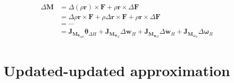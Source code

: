 \begin{equation}
    \begin{split}
        \Delta \mathbf{M} &= \Delta(\rho\mathbf{r}) \times \mathbf{F} + \rho\mathbf{r} \times \Delta\mathbf{F}\\
        &= \Delta\rho \mathbf{r} \times \mathbf{F} + \rho \Delta\mathbf{r} \times \mathbf{F} + \rho\mathbf{r} \times \Delta\mathbf{F}\\
        &= \cdots \\
        &= \mathbf{J}_{\mathbf{M}_{\boldsymbol{\theta}_{\Delta H}}}\boldsymbol{\theta}_{\Delta H} + \mathbf{J}_{\mathbf{M}_{\mathbf{w}_H}}\Delta \mathbf{w}_H + \mathbf{J}_{\mathbf{M}_{\dot{\mathbf{w}}_H}}\Delta {\dot{\mathbf{w}}}_H + \mathbf{J}_{\mathbf{M}_{\boldsymbol{\omega}_R}}\Delta \boldsymbol{\omega}_R\\
    \end{split}
\end{equation}

\section{Updated-updated approximation}

